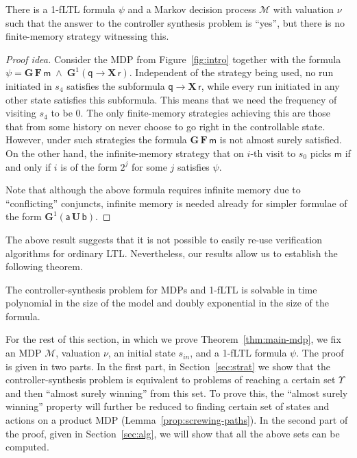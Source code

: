 \documentclass[a4paper,UKenglish]{lipics}
\newcommand{\mdp}{\mathcal{M}}
\newcommand{\Gf}[1]{\mathbf{G}^{#1}}
\newcommand{\X}{\mathbf{X}\,}
\newcommand{\G}{\mathbf{G}\,}
\newcommand{\U}{\,\mathbf{U}\,}
\newcommand{\F}{\mathbf{F}\,}
\newcommand{\sinit}{s_{in}}
\newcommand{\ap}[1]{\ensuremath{\mathsf{#1}}}
\begin{document}
\begin{theorem}\label{thm:inf}
	There is a 1-fLTL formula $\psi$ and a Markov decision process $\mdp$ with valuation $\nu$ such that the answer to the controller synthesis problem is ``yes'', but there is no finite-memory strategy witnessing this.
\end{theorem}
\begin{proof}[Proof idea]
	Consider the MDP from Figure~\ref{fig:intro} together with the formula
	$\psi = \G\F \ap{m} \;\land\; \Gf{1} (\ap{q} \rightarrow \X \ap{r} )$.
	Independent of the strategy being used, no run initiated in $s_4$ satisfies
	the subformula $\ap{q} \rightarrow \X \ap{r}$, while every run initiated in any other state satisfies
	this subformula. This means that we need the frequency of visiting $s_4$ to be $0$.
	The only finite-memory strategies achieving this are those that from some history
	on never choose to go right in the controllable state. However, under such strategies the formula  
	$\G\F \ap{m}$ is not almost surely satisfied.
On the other hand, the infinite-memory strategy that on $i$-th visit to $s_0$ picks $\ap{m}$ if and only if $i$ is of the form $2^j$ for some $j$ satisfies $\psi$.
	
	Note that although the above formula requires infinite memory due to ``conflicting'' conjuncts, infinite memory is needed already for simpler
	formulae of the form $\Gf{1}(\ap{a} \U \ap{b})$.
\end{proof}

The above result suggests that it is not possible to easily re-use verification algorithms for
ordinary LTL. Nevertheless, our results allow us to establish the following theorem.

\begin{theorem}\label{thm:main-mdp}
	The controller-synthesis problem for MDPs and 1-fLTL is solvable in time polynomial
	in the size of the model and doubly exponential in the size of the formula.
\end{theorem}

For the rest of this section, in which we prove Theorem~\ref{thm:main-mdp}, we fix an MDP $\mdp$, valuation $\nu$, an initial state $\sinit$,
and a 1-fLTL formula $\psi$. The proof is given in two parts. In the first part, in Section~\ref{sec:strat} we show that the controller-synthesis problem is equivalent to problems of reaching a certain set $\Upsilon$ and then ``almost surely winning'' from this set. To prove this, the ``almost surely winning'' property will further be reduced to finding certain set of states and actions on a product MDP (Lemma~\ref{prop:screwing-paths}). In the second part of the proof, given in Section~\ref{sec:alg}, we will show that all the above sets can be computed.
\end{document}

